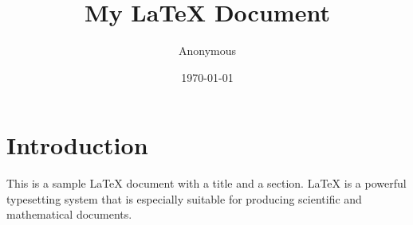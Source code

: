 \documentclass{article}
\title{My LaTeX Document}
\author{Anonymous}
\date{\today}
\begin{document}
\maketitle

\section{Introduction}
This is a sample LaTeX document with a title and a section. LaTeX is a powerful typesetting system that is especially suitable for producing scientific and mathematical documents.
\end{document}

